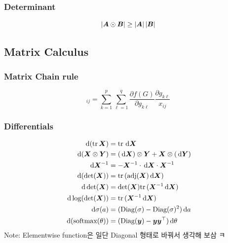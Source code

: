 \documentclass[10pt]{article}
\begin{document}
\subsubsection{Determinant}
\begin{equation}
    \left|{\bm{A}} \odot {\bm{B}}\right| \geq \left|{\bm{A}}\right| \left|{\bm{B}}\right|
\end{equation}
\subsection{Matrix Calculus}
\subsubsection{Matrix Chain rule}
\begin{equation}
    [\nabla_{\mX} f(g(\mX))]_{i j} = \sum_{k=1}^p \sum_{\ell=1}^q \frac{\partial f(G)}{\partial g_{k \ell}} \frac{\partial g_{k \ell}}{x_{i j }}
\end{equation}
\subsubsection{Differentials}
\begin{align}
    \,\mathrm{d}(\mathrm{tr}\,{{\bm{X}}}) &= \mathrm{tr}\,{\,\mathrm{d}{\bm{X}}}
\\
    \,\mathrm{d}({\bm{X}} \otimes {\bm{Y}}) &= (\,\mathrm{d}{\bm{X}}) \otimes {\bm{Y}} + {\bm{X}} \otimes (\,\mathrm{d}{\bm{Y}}) 
\\
    \,\mathrm{d}{\bm{X}}^{-1} &= - {\bm{X}}^{-1} \cdot \,\mathrm{d}{\bm{X}} \cdot {\bm{X}}^{-1}
\\
    \,\mathrm{d}(\det ({\bm{X}}) ) &= \mathrm{tr}\,( \text{adj}({\bm{X}}) \,\mathrm{d}{\bm{X}}) 
\\
    \,\mathrm{d}\det ({\bm{X}}) &= \det({\bm{X}}) \mathrm{tr}\,({\bm{X}}^{-1} \,\mathrm{d}{\bm{X}}) 
\\
    \,\mathrm{d}\log(\det({\bm{X}})) &= \mathrm{tr}\,({\bm{X}}^{-1} \,\mathrm{d}{\bm{X}}) 
\\ 
    \,\mathrm{d}\sigma(a) &= (\text{Diag}(\sigma) - \text{Diag}(\sigma)^2) \,\mathrm{d}a  
\\
    \,\mathrm{d}(\text{softmax}(\theta)) &= (\text{Diag}({\bm{y}}) - {\bm{y}} {\bm{y}}^{\top}) \,\mathrm{d}\theta
\end{align}
Note: Elementwise function은 일단 Diagonal 형태로 바꿔서 생각해 보삼 ㅋ 
\end{document}
